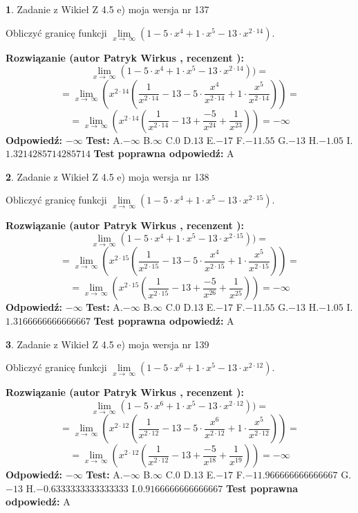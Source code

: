 \documentclass[12pt, a4paper]{article}
\theoremstyle{definition} %
\newtheorem{zad}{}
\newcommand{\zadStart}[1]{\begin{zad}#1\newline}
\newcommand{\zadStop}{\end{zad}}
\newcommand{\rozwStart}[2]{\noindent \textbf{Rozwiązanie (autor #1 , recenzent #2): }\newline}
\newcommand{\rozwStop}{\newline}
\newcommand{\odpStart}{\noindent \textbf{Odpowiedź:}\newline}
\newcommand{\odpStop}{\newline}
\newcommand{\testStart}{\noindent \textbf{Test:}\newline}
\newcommand{\testStop}{\newline}
\newcommand{\kluczStart}{\noindent \textbf{Test poprawna odpowiedź:}\newline}
\newcommand{\kluczStop}{\newline}
\begin{document}
\zadStart{Zadanie z Wikieł Z 4.5 e) moja wersja nr 137}


Obliczyć granicę funkcji  $\lim\limits_{x\to\ \infty}(1 - 5 \cdot x^{4}+1 \cdot x^{5}- 13 \cdot x^{2\cdot14})$.
\zadStop
\rozwStart{Patryk Wirkus}{}
$$\lim\limits_{x\to\ \infty}(1 - 5 \cdot x^{4}+1 \cdot x^{5}- 13 \cdot x^{2\cdot14}))=$$
$$=\lim\limits_{x\to\ \infty}(x^{2\cdot14}(\frac{1}{x^{2\cdot14}}-13 -5 \cdot \frac{x^{4}}{x^{2\cdot14}}+1 \cdot \frac{x^{5}}{x^{2\cdot14}}))=$$
$$=\lim\limits_{x\to\ \infty}(x^{2\cdot14}(\frac{1}{x^{2\cdot14}}-13 + \frac{-5}{x^{24}}+ \frac{1}{x^{23}}))=-\infty$$
\rozwStop
\odpStart
$-\infty$
\odpStop
\testStart
A.$-\infty$ B.$\infty$ C.$0$ D.$13$ E.$-17$
F.$-11.55$ G.$-13$
H.$-1.05$
I.$1.3214285714285714$
\testStop
\kluczStart
A
\kluczStop



\zadStart{Zadanie z Wikieł Z 4.5 e) moja wersja nr 138}


Obliczyć granicę funkcji  $\lim\limits_{x\to\ \infty}(1 - 5 \cdot x^{4}+1 \cdot x^{5}- 13 \cdot x^{2\cdot15})$.
\zadStop
\rozwStart{Patryk Wirkus}{}
$$\lim\limits_{x\to\ \infty}(1 - 5 \cdot x^{4}+1 \cdot x^{5}- 13 \cdot x^{2\cdot15}))=$$
$$=\lim\limits_{x\to\ \infty}(x^{2\cdot15}(\frac{1}{x^{2\cdot15}}-13 -5 \cdot \frac{x^{4}}{x^{2\cdot15}}+1 \cdot \frac{x^{5}}{x^{2\cdot15}}))=$$
$$=\lim\limits_{x\to\ \infty}(x^{2\cdot15}(\frac{1}{x^{2\cdot15}}-13 + \frac{-5}{x^{26}}+ \frac{1}{x^{25}}))=-\infty$$
\rozwStop
\odpStart
$-\infty$
\odpStop
\testStart
A.$-\infty$ B.$\infty$ C.$0$ D.$13$ E.$-17$
F.$-11.55$ G.$-13$
H.$-1.05$
I.$1.3166666666666667$
\testStop
\kluczStart
A
\kluczStop



\zadStart{Zadanie z Wikieł Z 4.5 e) moja wersja nr 139}


Obliczyć granicę funkcji  $\lim\limits_{x\to\ \infty}(1 - 5 \cdot x^{6}+1 \cdot x^{5}- 13 \cdot x^{2\cdot12})$.
\zadStop
\rozwStart{Patryk Wirkus}{}
$$\lim\limits_{x\to\ \infty}(1 - 5 \cdot x^{6}+1 \cdot x^{5}- 13 \cdot x^{2\cdot12}))=$$
$$=\lim\limits_{x\to\ \infty}(x^{2\cdot12}(\frac{1}{x^{2\cdot12}}-13 -5 \cdot \frac{x^{6}}{x^{2\cdot12}}+1 \cdot \frac{x^{5}}{x^{2\cdot12}}))=$$
$$=\lim\limits_{x\to\ \infty}(x^{2\cdot12}(\frac{1}{x^{2\cdot12}}-13 + \frac{-5}{x^{18}}+ \frac{1}{x^{19}}))=-\infty$$
\rozwStop
\odpStart
$-\infty$
\odpStop
\testStart
A.$-\infty$ B.$\infty$ C.$0$ D.$13$ E.$-17$
F.$-11.966666666666667$ G.$-13$
H.$-0.6333333333333333$
I.$0.9166666666666667$
\testStop
\kluczStart
A
\kluczStop
\end{document}
